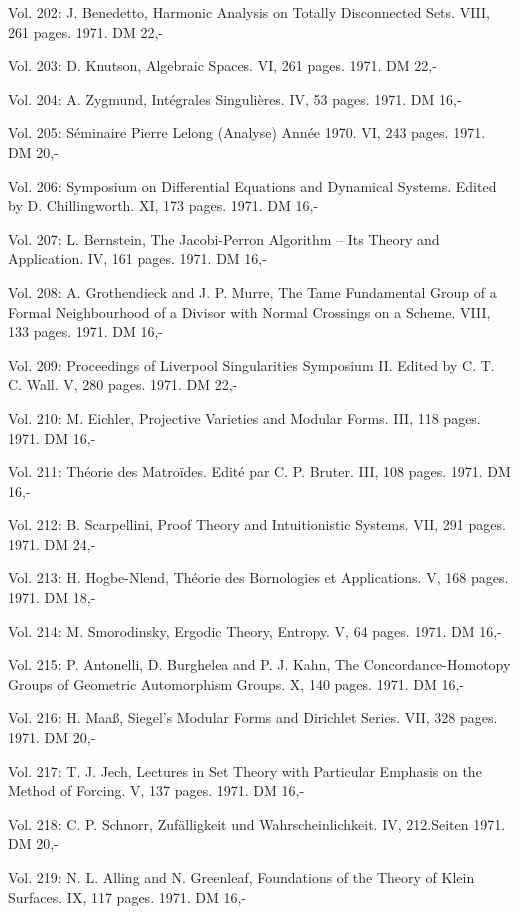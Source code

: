 Vol. 202: J. Benedetto, Harmonic Analysis on Totally Disconnected Sets. VIII, 261 pages. 1971. DM 22,-

Vol. 203: D. Knutson, Algebraic Spaces. VI, 261 pages. 1971. DM 22,-

Vol. 204: A. Zygmund, Intégrales Singulières. IV, 53 pages. 1971. DM 16,-

Vol. 205: Séminaire Pierre Lelong (Analyse) Année 1970. VI, 243 pages. 1971. DM 20,-

Vol. 206: Symposium on Differential Equations and Dynamical Systems. Edited by D. Chillingworth. XI, 173 pages. 1971. DM 16,-

Vol. 207: L. Bernstein, The Jacobi-Perron Algorithm -- Its Theory and Application. IV, 161 pages. 1971. DM 16,-

Vol. 208: A. Grothendieck and J. P. Murre, The Tame Fundamental Group of a Formal Neighbourhood of a Divisor with Normal Crossings on a Scheme. VIII, 133 pages. 1971. DM 16,-

Vol. 209: Proceedings of Liverpool Singularities \quad Symposium II. Edited by C. T. C. Wall. V, 280 pages. 1971. DM 22,-

Vol. 210: M. Eichler, Projective Varieties and Modular Forms. III, 118 pages. 1971. DM 16,-

Vol. 211: Théorie des Matroïdes. Edité par C. P. Bruter. III, 108 pages. 1971. DM 16,-

Vol. 212: B. Scarpellini, Proof Theory and Intuitionistic Systems. VII, 291 pages. 1971. DM 24,-

Vol. 213: H. Hogbe-Nlend, Théorie des Bornologies et Applications. V, 168 pages. 1971. DM 18,-

Vol. 214: M. Smorodinsky, Ergodic Theory, Entropy. V, 64 pages. 1971. DM 16,-

Vol. 215: P. Antonelli, D. Burghelea and P. J. Kahn, The Concordance-Homotopy Groups of Geometric Automorphism Groups. X, 140 pages. 1971. DM 16,-

Vol. 216: H. Maaß, Siegel's Modular Forms and Dirichlet Series. VII, 328 pages. 1971. DM 20,-

Vol. 217: T. J. Jech, Lectures in Set Theory with Particular Emphasis on the Method of Forcing. V, 137 pages. 1971. DM 16,-

Vol. 218: C. P. Schnorr, Zufälligkeit und Wahrscheinlichkeit. IV, 212.Seiten 1971. DM 20,-

Vol. 219: N. L. Alling and N. Greenleaf, Foundations of the Theory of Klein Surfaces. IX, 117 pages. 1971. DM 16,-

